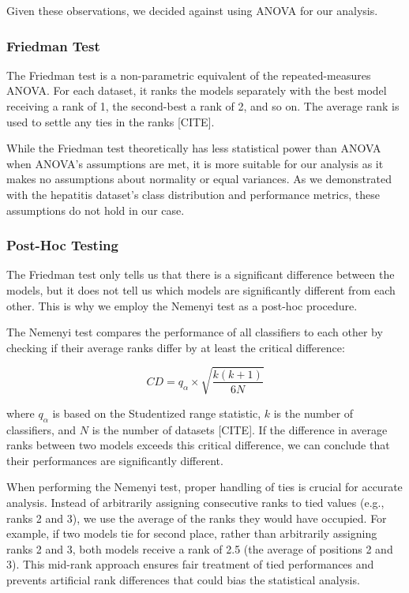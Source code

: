 Given these observations, we decided against using ANOVA for our analysis.

\subsubsection{Friedman Test}
The Friedman test is a non-parametric equivalent of the repeated-measures ANOVA. 
For each dataset, it ranks the models separately with the best model receiving a rank of 1, the second-best a rank of 2, and so on.
The average rank is used to settle any ties in the ranks [CITE].

While the Friedman test theoretically has less statistical power than ANOVA when ANOVA's assumptions are met,
it is more suitable for our analysis as it makes no assumptions about normality or equal variances.
As we demonstrated with the hepatitis dataset's class distribution and performance metrics, these assumptions do not hold in our case.

\subsubsection{Post-Hoc Testing}
The Friedman test only tells us that there is a significant difference between the models,
but it does not tell us which models are significantly different from each other.
This is why we employ the Nemenyi test as a post-hoc procedure.

The Nemenyi test compares the performance of all classifiers to each
other by checking if their average ranks differ by at least the critical difference:

\begin{equation}
    CD = q_{\alpha} \times \sqrt{\frac{k(k+1)}{6N}}
\end{equation}

where $q_{\alpha}$ is based on the Studentized range statistic, $k$ is the number of classifiers, and $N$ is the number of datasets [CITE].
If the difference in average ranks between two models exceeds this critical difference, we can conclude that their performances are significantly different.

When performing the Nemenyi test, proper handling of ties is crucial for accurate analysis.
Instead of arbitrarily assigning consecutive ranks to tied values (e.g., ranks 2 and 3), we use the
average of the ranks they would have occupied. For example, if two models tie for second place,
rather than arbitrarily assigning ranks 2 and 3, both models receive a rank of 2.5 (the average of positions 2 and 3).
This mid-rank approach ensures fair treatment of tied performances and prevents artificial rank differences that could bias the statistical analysis.

